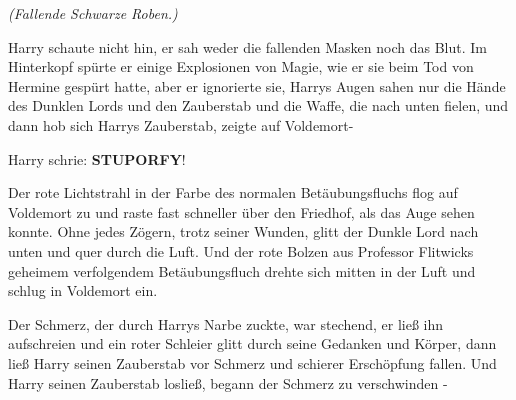 \emph{(Fallende Schwarze Roben.)}

Harry schaute nicht hin, er sah weder die fallenden Masken noch das Blut. Im
Hinterkopf spürte er einige Explosionen von Magie, wie er sie beim Tod von
Hermine gespürt hatte, aber er ignorierte sie, Harrys Augen sahen nur die Hände
des Dunklen Lords und den Zauberstab und die Waffe, die nach unten fielen, und
dann hob sich Harrys Zauberstab, zeigte auf Voldemort-

Harry schrie: \glqq{}\textbf{STUPORFY}!\grqq{}

Der rote Lichtstrahl in der Farbe des normalen Betäubungsfluchs flog auf
Voldemort zu und raste fast schneller über den Friedhof, als das Auge sehen
konnte. Ohne jedes Zögern, trotz seiner Wunden, glitt der Dunkle Lord nach unten
und quer durch die Luft. Und der rote Bolzen aus Professor Flitwicks geheimem
verfolgendem Betäubungsfluch drehte sich mitten in der Luft und schlug in
Voldemort ein.

Der Schmerz, der durch Harrys Narbe zuckte, war stechend, er ließ ihn
aufschreien und ein roter Schleier glitt durch seine Gedanken und Körper, dann
ließ Harry seinen Zauberstab vor Schmerz und schierer Erschöpfung fallen. Und
Harry seinen Zauberstab losließ, begann der Schmerz zu verschwinden -

